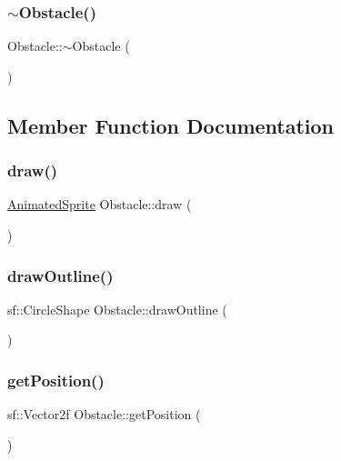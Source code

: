 \mbox{\label{class_obstacle_af2f9cc9c6cff75dca0974fd5ac4f71a9}} 
\subsubsection{\texorpdfstring{$\sim$\+Obstacle()}{~Obstacle()}}
{\footnotesize\ttfamily Obstacle\+::$\sim$\+Obstacle (\begin{DoxyParamCaption}{ }\end{DoxyParamCaption})}



\subsection{Member Function Documentation}
\mbox{\label{class_obstacle_add40c7f26670ee029480df409794269f}} 
\subsubsection{\texorpdfstring{draw()}{draw()}}
{\footnotesize\ttfamily \hyperlink{class_animated_sprite}{Animated\+Sprite} Obstacle\+::draw (\begin{DoxyParamCaption}{ }\end{DoxyParamCaption})}

\mbox{\label{class_obstacle_aa353922843ff431a387e8988bc5f5364}} 
\subsubsection{\texorpdfstring{draw\+Outline()}{drawOutline()}}
{\footnotesize\ttfamily sf\+::\+Circle\+Shape Obstacle\+::draw\+Outline (\begin{DoxyParamCaption}{ }\end{DoxyParamCaption})}

\mbox{\label{class_obstacle_a9717d2aec256d18e12d773e42e2c5034}} 
\subsubsection{\texorpdfstring{get\+Position()}{getPosition()}}
{\footnotesize\ttfamily sf\+::\+Vector2f Obstacle\+::get\+Position (\begin{DoxyParamCaption}{ }\end{DoxyParamCaption})}

